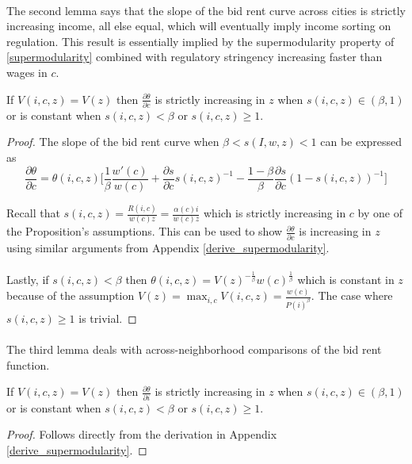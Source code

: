 \documentclass[12pt]{article}
\begin{document}
	\paragraph*{}
	The second lemma says that the slope of the bid rent curve across cities is strictly increasing income, all else equal, which will eventually imply income sorting on regulation. This result is essentially implied by the supermodularity property of \eqref{supermodularity} combined with regulatory stringency increasing faster than wages in $c$. 
	
	\begin{Lemma}
		If $V(i, c, z) = V(z)$ then $\frac{\partial \theta}{\partial c}$ is strictly increasing in $z$ when $s(i, c, z) \in (\beta, 1)$ or is constant when $s(i, c, z) < \beta$ or $s(i, c, z) \geq 1$. 
	\end{Lemma}
	\begin{proof}
		 The slope of the bid rent curve when $\beta < s(I, w, z) < 1$ can be expressed as $$\frac{\partial \theta}{\partial c} = \theta(i, c, z)\bigg[\frac{1}{\beta}\frac{w'(c)}{w(c)} + \frac{\partial s}{\partial c}s(i, c, z)^{-1} - \frac{1 - \beta}{\beta}\frac{\partial s}{\partial c}(1 - s(i, c, z))^{-1}\bigg]$$
		
		 Recall that $s(i, c, z) = \frac{R(i, c)}{w(c)z} = \frac{\alpha(c)i}{w(c)z}$ which is strictly increasing in $c$ by one of the Proposition's assumptions. This can be used to show $\frac{\partial \theta}{\partial c}$ is increasing in $z$ using similar arguments from Appendix \ref{derive_supermodularity}. 
		 
		 \paragraph*{}
		 Lastly, if $s(i, c, z) < \beta$ then  $\theta(i, c, z) = V(z)^{-\frac{1}{\beta}}w(c)^{\frac{1}{\beta}}$ which is constant in $z$ because of the assumption $V(z) = \max_{i, c}V(i, c, z) =  \frac{w(c)}{P(i)^{\beta}}$. The case where $s(i, c, z) \geq 1$ is trivial.
		  
	\end{proof} 
	
	\paragraph*{}
	The third lemma deals with across-neighborhood comparisons of the bid rent function. 
	\begin{Lemma}
		If $V(i, c, z) = V(z)$ then $\frac{\partial \theta}{\partial i}$ is strictly increasing in $z$ when $s(i, c, z) \in (\beta, 1)$ or is constant when $s(i, c, z) < \beta$ or $s(i, c, z) \geq 1$. 
		
		\begin{proof}
			Follows directly from the derivation in Appendix \ref{derive_supermodularity}. 
		\end{proof}
	\end{Lemma}
	
\end{document}
